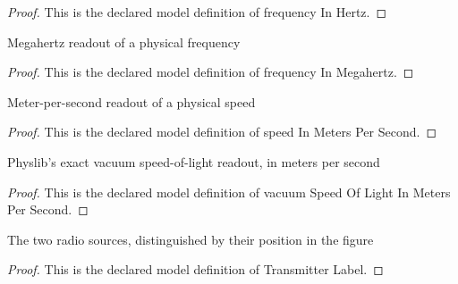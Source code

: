 \begin{proof}
  This is the declared model definition of frequency In Hertz.
\end{proof}
\begin{definition}
  \label{def:physics:phyx-mini-0247:phyxminiproblems-problemphyxmini0247-frequencyinmegahertz}
  Megahertz readout of a physical frequency
\end{definition}
\begin{proof}
  This is the declared model definition of frequency In Megahertz.
\end{proof}
\begin{definition}
  \label{def:physics:phyx-mini-0247:phyxminiproblems-problemphyxmini0247-speedinmeterspersecond}
  Meter-per-second readout of a physical speed
\end{definition}
\begin{proof}
  This is the declared model definition of speed In Meters Per Second.
\end{proof}
\begin{definition}
  \label{def:physics:phyx-mini-0247:phyxminiproblems-problemphyxmini0247-vacuumspeedoflightinmeterspersecond}
  Physlib's exact vacuum speed-of-light readout, in meters per second
\end{definition}
\begin{proof}
  This is the declared model definition of vacuum Speed Of Light In Meters Per Second.
\end{proof}
\begin{definition}
  \label{def:physics:phyx-mini-0247:phyxminiproblems-problemphyxmini0247-transmitterlabel}
  The two radio sources, distinguished by their position in the figure
\end{definition}
\begin{proof}
  This is the declared model definition of Transmitter Label.
\end{proof}
